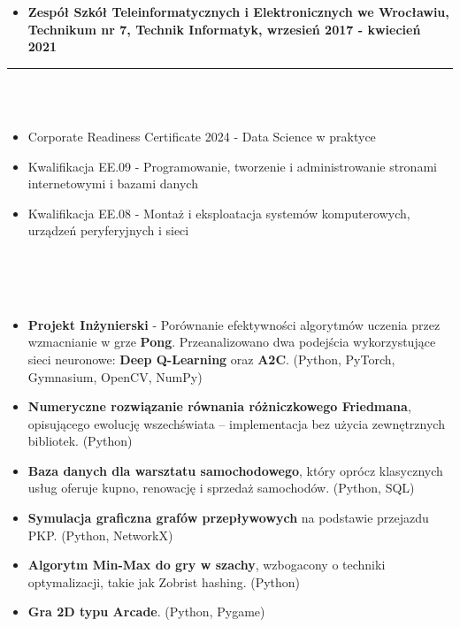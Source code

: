 \documentclass[10pt]{article}
\begin{document}
\begin{paracol}{2}
\begin{rightcolumn}
\begin{itemize}[leftmargin=*]
        \item \textbf{Zespół Szkół Teleinformatycznych i Elektronicznych we Wrocławiu, Technikum nr 7, Technik Informatyk, wrzesień 2017 - kwiecień 2021} 
    \end{itemize}
    \rule{11cm}{1pt} \\ \\
    \fontsize{10pt}{10pt}
    \begin{itemize}[leftmargin=*]
        \setlength{\parskip}{0pt}
        \item Corporate Readiness Certificate 2024 - Data Science w praktyce
        \item Kwalifikacja EE.09 - Programowanie, tworzenie i administrowanie stronami
        internetowymi i bazami danych
        \item Kwalifikacja EE.08 - Montaż i eksploatacja systemów komputerowych, urządzeń
        peryferyjnych i sieci
    \end{itemize}
    \rule{0pt}{0pt} \\ \\ \\
    \fontsize{10pt}{10pt}
    \begin{itemize}[leftmargin=*]
        \setlength{\parskip}{0pt}
        \item \textbf{Projekt Inżynierski} - Porównanie efektywności algorytmów uczenia przez wzmacnianie w grze \textbf{Pong}. 
        Przeanalizowano dwa podejścia wykorzystujące sieci neuronowe: \textbf{Deep Q-Learning} oraz \textbf{A2C}.
        (Python, PyTorch, Gymnasium, OpenCV, NumPy)
        \item \textbf{Numeryczne rozwiązanie równania różniczkowego Friedmana}, opisującego ewolucję wszechświata – implementacja bez użycia zewnętrznych bibliotek.
        (Python)
        \item \textbf{Baza danych dla warsztatu samochodowego}, który oprócz klasycznych usług oferuje kupno, renowację i sprzedaż samochodów.
        (Python, SQL)
        \item \textbf{Symulacja graficzna grafów przepływowych} na podstawie przejazdu PKP.
        (Python, NetworkX)
        \item \textbf{Algorytm Min-Max do gry w szachy}, wzbogacony o techniki optymalizacji, takie jak Zobrist hashing.
        (Python)
        \item \textbf{Gra 2D typu Arcade}.
        (Python, Pygame)
    \end{itemize}

\end{rightcolumn}
\end{paracol}
\end{document}
